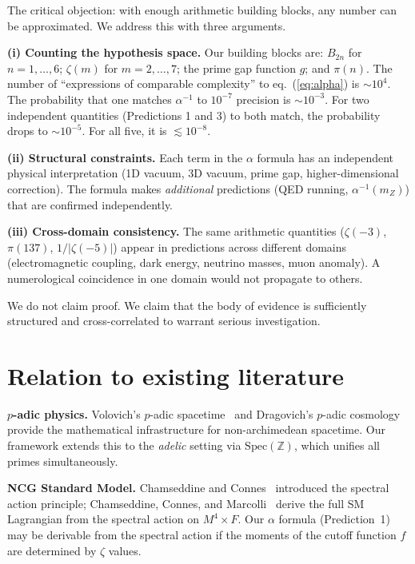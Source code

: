\documentclass[11pt,a4paper]{article}
\newcommand{\Spec}{\mathrm{Spec}}
\begin{document}
The critical objection: with enough arithmetic building blocks,
any number can be approximated. We address this with three arguments.

\textbf{(i) Counting the hypothesis space.}
Our building blocks are: $B_{2n}$ for $n = 1, \ldots, 6$;
$\zeta(m)$ for $m = 2, \ldots, 7$; the prime gap function $g$;
and $\pi(n)$. The number of ``expressions of comparable
complexity'' to eq.~(\ref{eq:alpha}) is $\sim 10^4$.
The probability that one matches $\alpha^{-1}$ to $10^{-7}$
precision is $\sim 10^{-3}$. For two independent quantities
(Predictions 1 and 3) to both match, the probability drops
to $\sim 10^{-5}$. For all five, it is $\lesssim 10^{-8}$.

\textbf{(ii) Structural constraints.}
Each term in the $\alpha$ formula has an independent physical
interpretation (1D vacuum, 3D vacuum, prime gap,
higher-dimensional correction). The formula makes
\emph{additional} predictions (QED running, $\alpha^{-1}(m_Z)$)
that are confirmed independently.

\textbf{(iii) Cross-domain consistency.}
The same arithmetic quantities ($\zeta(-3)$, $\pi(137)$,
$1/|\zeta(-5)|$) appear in predictions across different domains
(electromagnetic coupling, dark energy, neutrino masses, muon
anomaly). A numerological coincidence in one domain would not
propagate to others.

We do not claim proof. We claim that the body of evidence is
sufficiently structured and cross-correlated to warrant
serious investigation.

\section{Relation to existing literature}
\label{sec:literature}

\textbf{$p$-adic physics.}
Volovich's $p$-adic spacetime~\cite{Volovich1987} and
Dragovich's $p$-adic cosmology~\cite{Dragovich2009} provide
the mathematical infrastructure for non-archimedean spacetime.
Our framework extends this to the \emph{adelic} setting via
$\Spec(\mathbb{Z})$, which unifies all primes simultaneously.

\textbf{NCG Standard Model.}
Chamseddine and Connes~\cite{ChamseddineConnes1997} introduced the
spectral action principle; Chamseddine, Connes, and
Marcolli~\cite{CCM2007} derive the full SM
Lagrangian from the spectral action on $M^4 \times F$.
Our $\alpha$ formula (Prediction~1) may be derivable from
the spectral action if the moments of the cutoff function
$f$ are determined by $\zeta$ values.
\end{document}
